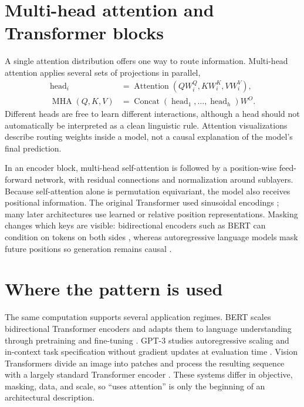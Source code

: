 \documentclass{article}
\begin{document}
\section{Multi-head attention and Transformer blocks}

A single attention distribution offers one way to route information.
Multi-head attention applies several sets of projections in parallel,
\begin{align}
  \operatorname{head}_i &= \operatorname{Attention}(QW_i^Q,KW_i^K,VW_i^V),\\
  \operatorname{MHA}(Q,K,V) &= \operatorname{Concat}(\operatorname{head}_1,\ldots,\operatorname{head}_h)W^O.
\end{align}
Different heads are free to learn different interactions, although a head should not automatically be interpreted as a clean linguistic rule.
Attention visualizations describe routing weights inside a model, not a causal explanation of the model's final prediction.

In an encoder block, multi-head self-attention is followed by a position-wise feed-forward network, with residual connections and normalization around sublayers.
Because self-attention alone is permutation equivariant, the model also receives positional information.
The original Transformer used sinusoidal encodings \citep{vaswani2017attention}; many later architectures use learned or relative position representations.
Masking changes which keys are visible: bidirectional encoders such as BERT can condition on tokens on both sides \citep{devlin2019bert}, whereas autoregressive language models mask future positions so generation remains causal \citep{brown2020language}.

\section{Where the pattern is used}

The same computation supports several application regimes.
BERT scales bidirectional Transformer encoders and adapts them to language understanding through pretraining and fine-tuning \citep{devlin2019bert}.
GPT-3 studies autoregressive scaling and in-context task specification without gradient updates at evaluation time \citep{brown2020language}.
Vision Transformers divide an image into patches and process the resulting sequence with a largely standard Transformer encoder \citep{dosovitskiy2021image}.
These systems differ in objective, masking, data, and scale, so ``uses attention'' is only the beginning of an architectural description.
\end{document}
